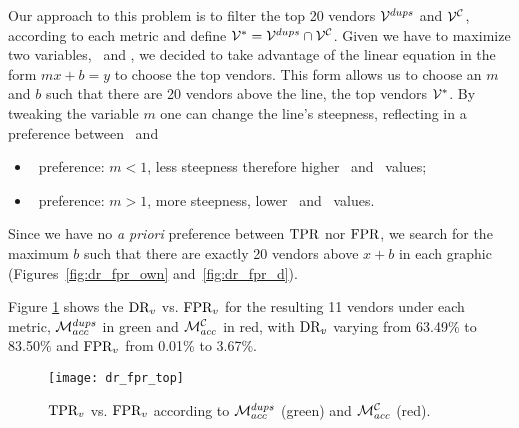 Our approach to this problem is to filter the top 20 vendors $\mathcal{V}^{{dups}}$ and $\mathcal{V}^{\mathcal{C}}$, according to each metric and define $\mathcal{V}^*=\mathcal{V}^{{dups}}\cap\mathcal{V}^{\mathcal{C}}$.
Given we have to maximize two variables, \tpr\ and \fpr, we decided to take advantage of the linear equation in the form $mx+b=y$ to choose the top vendors.
This form allows us to choose an $m$ and $b$ such that there are 20 vendors above the line, the top vendors $\mathcal{V}^*$.
By tweaking the variable $m$ one can change the line's steepness, reflecting in a preference between \tpr\ and \fpr\:

\begin{itemize}
	\item \tpr\ preference: $m < 1$, less steepness therefore higher \fpr\ and \tpr\ values;
	\item \fpr\ preference: $m > 1$, more steepness, lower \fpr\ and \tpr\ values.
\end{itemize}


Since we have no \emph{a priori} preference between $\textrm{TPR}$ nor $\textrm{FPR}$, we search for the maximum $b$ such that there are exactly 20 vendors above $x+b$ in each graphic (Figures~\ref{fig:dr_fpr_own} and~\ref{fig:dr_fpr_d}).

Figure \ref{fig:dr_fpr_top} shows the $\textrm{DR}_v$ vs. $\textrm{FPR}_v$ for the resulting 11 vendors under each metric, $\mathcal{M}_{acc}^{{dups}}$ in green and $\mathcal{M}_{acc}^{\mathcal{C}}$ in red, with $\textrm{DR}_v$ varying from 63.49\% to 83.50\% and $\textrm{FPR}_v$ from 0.01\% to 3.67\%.

\begin{figure}[!h]
	\centering
	\texttt{[image: dr\_fpr\_top]}
	\caption{$\textrm{TPR}_v$ vs. $\textrm{FPR}_v$ according to $\mathcal{M}_{acc}^{{dups}}$ (green) and $\mathcal{M}_{acc}^{\mathcal{C}}$ (red).}
	\label{fig:dr_fpr_top}
\end{figure}




